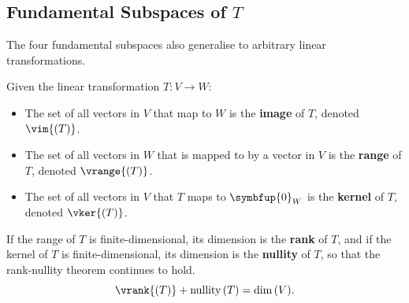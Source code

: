 \documentclass{article}
\DeclareMathOperator*{\nullity}{nullity}
\begin{document}
\subsection{Fundamental Subspaces of \texorpdfstring{\(T\)}{T}}
The four fundamental subspaces also generalise to arbitrary linear transformations.

Given the linear transformation \(T:V \to W\):
\begin{itemize}
    \item The set of all vectors in \(V\) that map to \(W\) is the \textbf{image} of \(T\), denoted \(\vim{\left( T \right)}\).
    \item The set of all vectors in \(W\) that is mapped to by a vector in \(V\) is the \textbf{range} of \(T\), denoted \(\vrange{\left( T \right)}\).
    \item The set of all vectors in \(V\) that \(T\) maps to \(\symbfup{0}_W\) is the \textbf{kernel} of \(T\), denoted \(\vker{\left( T \right)}\).
\end{itemize}
If the range of \(T\) is finite-dimensional, its dimension is the \textbf{rank} of \(T\), and
if the kernel of \(T\) is finite-dimensional, its dimension is the \textbf{nullity} of \(T\), so
that the rank-nullity theorem continues to hold.
\begin{equation*}
    \vrank{\left( T \right)} + \nullity{\left( T \right)} = \dim{\left( V \right)}.
\end{equation*}
\end{document}
